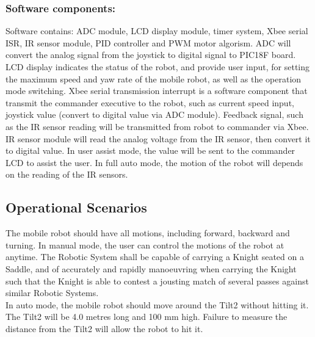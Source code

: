 \documentclass[MTRX3700report.tex]{subfiles}
\begin{document}
\subsubsection{Software components:}
Software contains: ADC module, LCD display module, timer system, Xbee serial ISR, IR sensor module, PID controller and PWM motor algorism. ADC will convert the analog signal from the joystick to digital signal to PIC18F board. LCD display indicates the status of the robot, and provide user input, for setting the maximum speed and yaw rate of the mobile robot, as well as the operation mode switching. Xbee serial transmission interrupt is a software component that transmit the commander executive to the robot, such as current speed input, joystick value (convert to digital value via ADC module). Feedback signal, such as the IR sensor reading will be transmitted from robot to commander via Xbee. IR sensor module will read the analog voltage from the IR sensor, then convert it to digital value. In user assist mode, the value will be sent to the commander LCD to assist the user. In full auto mode, the motion of the robot will depends on the reading of the IR sensors.

\subsection{Operational Scenarios}
The mobile robot should have all motions, including forward, backward and turning.  In manual mode, the user can control the motions of the robot at anytime.
The Robotic System shall be capable of carrying a Knight seated on a Saddle, and of accurately and rapidly manoeuvring when carrying the Knight such that the Knight is able to contest a jousting match of several passes against similar Robotic Systems.\\
In auto mode, the mobile robot should move around the Tilt2 without hitting it. The Tilt2 will be 4.0 metres long and 100 mm high. Failure to measure the distance from the Tilt2 will allow the robot to hit it. 
\end{document}
